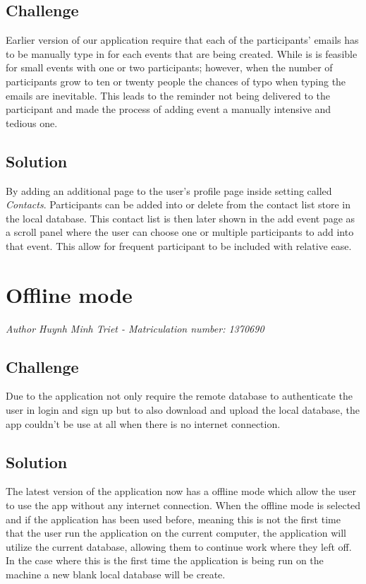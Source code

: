 \subsection{Challenge}
Earlier version of our application require that each of the participants' emails has to be manually
type in for each events that are being created. While is is feasible for small events with one or two
participants; however, when the number of participants grow to ten or twenty people the chances of typo when 
typing the emails are inevitable. This leads to the reminder not being delivered to the participant and
made the process of adding event a manually intensive and tedious one.

\subsection{Solution}
By adding an additional page to the user's profile page inside setting called  \emph{Contacts}.
Participants can be added into or delete from the contact list store in the local database. 
This contact list is then later shown in the add event page as a scroll panel where the user can 
choose one or multiple participants to add into that event. This allow for frequent participant to be
included with relative ease.


\section{Offline mode}
\emph{Author Huynh Minh Triet - Matriculation number: 1370690}

\subsection{Challenge}
Due to the application not only require the remote database to authenticate the user in login and sign 
up but to also download and upload the local database, the app couldn't be use at all when there
is no internet connection.

\subsection{Solution}
The latest version of the application now has a offline mode which allow the user to use the app 
without any internet connection. When the offline mode is selected and if the application has been
used before, meaning this is not the first time that the user run the application on the current
computer, the application will utilize the current database, allowing them to continue work where
they left off. In the case where this is the first time the application is being run on the machine
a new blank local database will be create.

